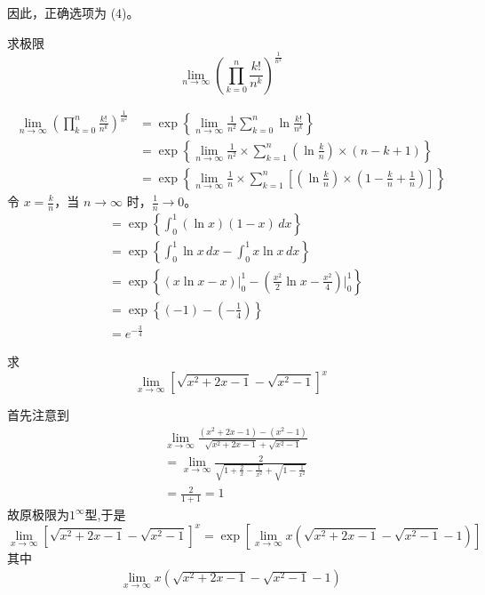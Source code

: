 \begin{questions}
\begin{solution}
因此，正确选项为 (4)。
\end{solution}

\question
求极限
\[
\lim_{n \to \infty} \left( \prod_{k=0}^{n} \frac{k!}{n^k} \right)^{\frac{1}{n^2}}
\]
\begin{solution}
\begin{align*}
\lim_{n \to \infty} \left( \prod_{k=0}^{n} \frac{k!}{n^k} \right)^{\frac{1}{n^2}}
&= \exp \left\{ \lim_{n \to \infty} \frac{1}{n^2} \sum_{k=0}^{n} \ln \frac{k!}{n^k} \right\} \\
&= \exp \left\{ \lim_{n \to \infty} \frac{1}{n^2} \times \sum_{k=1}^{n} \left( \ln \frac{k}{n} \right) \times (n-k+1) \right\} \\
&= \exp \left\{ \lim_{n \to \infty} \frac{1}{n} \times \sum_{k=1}^{n} \left[ \left( \ln \frac{k}{n} \right) \times \left( 1-\frac{k}{n}+\frac{1}{n} \right) \right] \right\}
\end{align*}
令 $x = \frac{k}{n}$，当 $n \to \infty$ 时，$\frac{1}{n} \to 0$。
\begin{align*}
&= \exp \left\{ \int_{0}^{1} (\ln x)(1-x) \,dx \right\} \\
&= \exp \left\{ \int_{0}^{1} \ln x \,dx - \int_{0}^{1} x \ln x \,dx \right\} \\
&= \exp \left\{ (x \ln x - x) \big|_{0}^{1} - \left( \frac{x^2}{2} \ln x - \frac{x^2}{4} \right) \big|_{0}^{1} \right\} \\
&= \exp \left\{ (-1) - \left( -\frac{1}{4} \right) \right\} \\
&= e^{-\frac{3}{4}}
\end{align*}
\end{solution}
    \question 求
    \[
    \lim_{x\to\infty} \left[\sqrt{x^2+2x-1}-\sqrt{x^2-1}\right]^x
    \]
    \begin{solution}
        首先注意到
        \begin{align*}
        &\lim_{x\to\infty} \frac{(x^2+2x-1)-(x^2-1)}{\sqrt{x^2+2x-1}+\sqrt{x^2-1}} \\
        &= \lim_{x\to\infty} \frac{2}{\sqrt{1+\frac{2}{x}-\frac{1}{x^2}} + \sqrt{1-\frac{1}{x^2}}} \\
        &= \frac{2}{1+1} = 1
        \end{align*}
        故原极限为$1^\infty$型,于是
        \[
        \lim_{x\to\infty} \left[\sqrt{x^2+2x-1}-\sqrt{x^2-1}\right]^x = \exp\left[\lim_{x\to\infty} x \left( \sqrt{x^2+2x-1} - \sqrt{x^2-1} - 1 \right)\right]
        \]
        其中
        \begin{align*}
        \lim_{x\to\infty} x \left( \sqrt{x^2+2x-1} - \sqrt{x^2-1} - 1 \right)

\end{align*}
\end{solution}
\end{questions}
